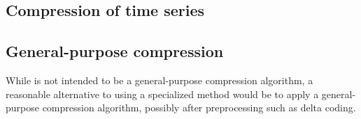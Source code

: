 \subsection{Compression of time series}




\subsection{General-purpose compression}
While \mine is not intended to be a general-purpose compression algorithm, a reasonable alternative to using a specialized method would be to apply a general-purpose compression algorithm, possibly after preprocessing such as delta coding.

